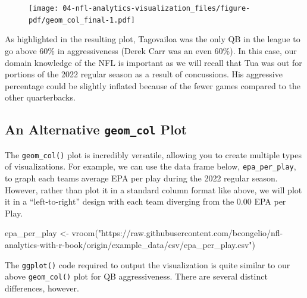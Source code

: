 \documentclass[
  letterpaper,
]{krantz}
\newenvironment{Shaded}{\begin{snugshade}}{\end{snugshade}}
\newcommand{\FunctionTok}[1]{\textcolor[rgb]{0.28,0.35,0.67}{#1}}
\newcommand{\NormalTok}[1]{\textcolor[rgb]{0.00,0.23,0.31}{#1}}
\newcommand{\OtherTok}[1]{\textcolor[rgb]{0.00,0.23,0.31}{#1}}
\newcommand{\StringTok}[1]{\textcolor[rgb]{0.13,0.47,0.30}{#1}}
\begin{document}
\begin{figure}[H]

{\centering \texttt{[image: 04-nfl-analytics-visualization\_files/figure-pdf/geom\_col\_final-1.pdf]}

}

\end{figure}

As highlighted in the resulting plot, Tagovailoa was the only QB in the
league to go above 60\% in aggressiveness (Derek Carr was an even 60\%).
In this case, our domain knowledge of the NFL is important as we will
recall that Tua was out for portions of the 2022 regular season as a
result of concussions. His aggressive percentage could be slightly
inflated because of the fewer games compared to the other quarterbacks.

\hypertarget{an-alternative-geom_col-plot}{%
\subsection{\texorpdfstring{An Alternative \texttt{geom\_col}
Plot}{An Alternative geom\_col Plot}}\label{an-alternative-geom_col-plot}}

The \texttt{geom\_col()} plot is incredibly versatile, allowing you to
create multiple types of visualizations. For example, we can use the
data frame below, \texttt{epa\_per\_play}, to graph each teams average
EPA per play during the 2022 regular season. However, rather than plot
it in a standard column format like above, we will plot it in a
``left-to-right'' design with each team diverging from the 0.00 EPA per
Play.

\begin{Shaded}
\begin{Highlighting}[]
\NormalTok{epa\_per\_play }\OtherTok{\textless{}{-}}
  \FunctionTok{vroom}\NormalTok{(}\StringTok{"https://raw.githubusercontent.com/bcongelio/nfl{-}analytics{-}with{-}r{-}book/origin/example\_data/csv/epa\_per\_play.csv"}\NormalTok{)}
\end{Highlighting}
\end{Shaded}

The \texttt{ggplot()} code required to output the visualization is quite
similar to our above \texttt{geom\_col()} plot for QB aggressiveness.
There are several distinct differences, however.
\end{document}
